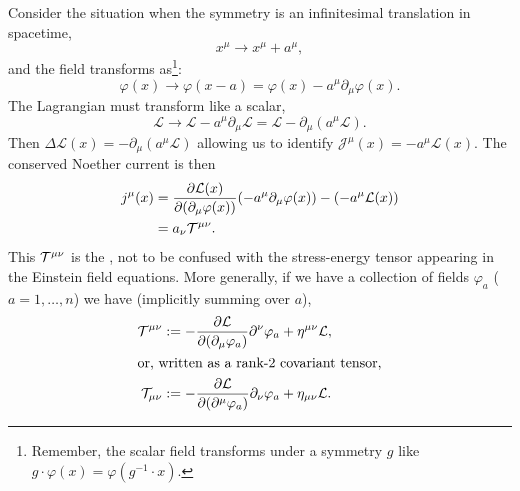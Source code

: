 \begin{example}\label{ex:classical-field-theory:noether:canonical-stress-energy}
Consider the situation when the symmetry is an infinitesimal translation
in spacetime,
\begin{equation}
x^{\mu}\to x^{\mu} + a^{\mu},
\end{equation}
and the field transforms as\footnote{Remember, the scalar field
transforms under a symmetry $g$ like
$g\cdot\varphi(x)=\varphi(g^{-1}\cdot x)$.}:
\begin{equation}
\varphi(x)\to\varphi(x-a)=\varphi(x)-a^{\mu}\partial_{\mu}\varphi(x).
\end{equation}
The Lagrangian must transform like a scalar,
\begin{equation}
\mathcal{L}\to\mathcal{L}-a^{\mu}\partial_{\mu}\mathcal{L}
=\mathcal{L} - \partial_{\mu}(a^{\mu}\mathcal{L}).
\end{equation}
Then $\Delta\mathcal{L}(x)=- \partial_{\mu}(a^{\mu}\mathcal{L})$
allowing us to identify $\mathcal{J}^{\mu}(x)=-a^{\mu}\mathcal{L}(x)$.
The conserved Noether current is then
\begin{equation}
\begin{split}
j^{\mu}(x) &= \frac{\partial\mathcal{L}(x)}{\partial(\partial_{\mu}\varphi(x))}(-a^{\mu}\partial_{\mu}\varphi(x))
- (-a^{\mu}\mathcal{L}(x))\\
&=a_{\nu}\mathcal{T}^{\mu\nu}.
\end{split}
\end{equation}
This $\mathcal{T}^{\mu\nu}$ is the
, not to be confused 
with the stress-energy tensor appearing in the Einstein field equations.
More generally, if we have a collection of fields $\varphi_{a}$ ($a=1,\dots,n$)
we have (implicitly summing over $a$),
\begin{subequations}
\begin{align}
\mathcal{T}^{\mu\nu} &:= -\frac{\partial\mathcal{L}}{\partial(\partial_{\mu}\varphi_{a})}\partial^{\nu}\varphi_{a}+\eta^{\mu\nu}\mathcal{L},\\
\intertext{or, written as a rank-2 covariant tensor,}
\mathcal{T}_{\mu\nu} &:= -\frac{\partial\mathcal{L}}{\partial(\partial^{\mu}\varphi_{a})}\partial_{\nu}\varphi_{a}+\eta_{\mu\nu}\mathcal{L}.
\end{align}
\end{subequations}
\end{example}

